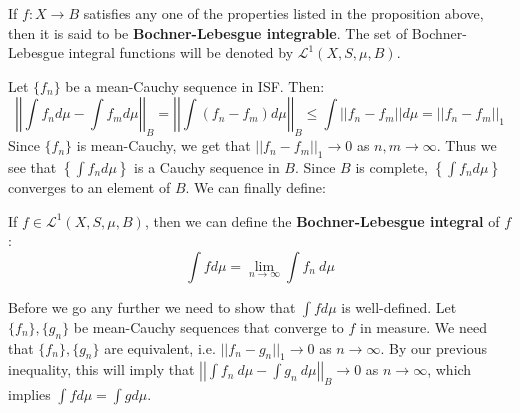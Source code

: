 \documentclass[a4paper,12pt]{report}
\newcommand{\ms}[1]{\mathscr{#1}}
\newenvironment{definition}[1][Definition.]{\begin{trivlist}
\item[\hskip \labelsep {\bfseries #1}]}{\end{trivlist}}
\begin{document}
	\begin{definition}
	If $f : X \rightarrow B$ satisfies any one of the properties listed in the proposition above, then it is said to be \textbf{Bochner-Lebesgue integrable}. The set of Bochner-Lebesgue integral functions will be denoted by $\ms{L}^1(X, S, \mu, B)$. 
	\end{definition}
	
	\noindent Let $\{f_n\}$ be a mean-Cauchy sequence in ISF. Then:
	\[ \left|\left| \int f_n d\mu - \int f_m d\mu \right|\right|_B = \left|\left| \int (f_n - f_m) d\mu\right|\right|_B \leq \int ||f_n - f_m|| d\mu = ||f_n - f_m||_1 \]
	Since $\{f_n\}$ is mean-Cauchy, we get that $||f_n - f_m||_1 \rightarrow 0$ as $n, m \rightarrow \infty$. Thus we see that $\left\{\int f_n d\mu\right\}$ is a Cauchy sequence in $B$. Since $B$ is complete, $\left\{\int f_n d\mu\right\}$ converges to an element of $B$. We can finally define:
	
	\begin{definition}
	If $f \in \ms{L}^1(X, S, \mu, B)$, then we can define the \textbf{Bochner-Lebesgue integral} of $f$:
	\[ \int f d\mu = \lim_{n \rightarrow \infty} \int f_n ~ d\mu \]
	\end{definition}

	\noindent Before we go any further we need to show that $\int f d\mu$ is well-defined. Let $\{f_n\}, \{g_n\}$ be mean-Cauchy sequences that converge to $f$ in measure. We need that $\{f_n\}, \{g_n\}$ are equivalent, i.e. $||f_n - g_n||_1 \rightarrow 0$ as $n \rightarrow \infty$. By our previous inequality, this will imply that $\left|\left|\int f_n ~ d\mu - \int g_n ~ d\mu \right|\right|_B \rightarrow 0$ as $n \rightarrow \infty$, which implies $\int f d\mu = \int g d\mu$. 
	
\end{document}
